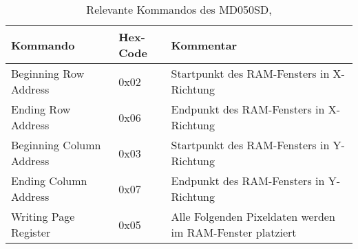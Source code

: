 \begin{table}[h]
\begin{tabular}{|p{4cm}|p{1cm}|p{8cm}|}\hline
\rowcolor{TableBackgroundColor}
   \textbf{Kommando} & \textbf{Hex-Code} & \textbf{Kommentar}\\ \hline
   Beginning Row Address & 0x02 & Startpunkt des RAM-Fensters in X-Richtung \\ \hline
   Ending Row Address& 0x06 & Endpunkt des RAM-Fensters in X-Richtung \\ \hline
   Beginning Column Address & 0x03 & Startpunkt des RAM-Fensters in Y-Richtung \\ \hline
   Ending Column Address& 0x07 & Endpunkt des RAM-Fensters in Y-Richtung \\ \hline
   Writing Page Register & 0x05 & Alle Folgenden Pixeldaten werden im RAM-Fenster platziert \\ \hline
\end{tabular}
\caption{Relevante Kommandos des MD050SD, \cite{ITEAD2013}}
\label{tab:Kommandos_MD050SD}
\end{table}

% 







